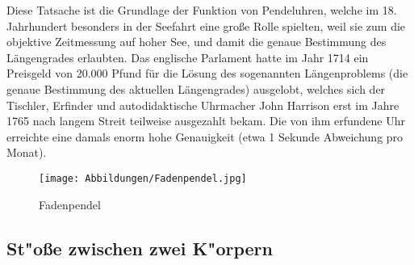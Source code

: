 Diese Tatsache ist die Grundlage der Funktion von Pendeluhren, welche im 18. Jahrhundert besonders in der Seefahrt eine große Rolle spielten, weil sie zum die objektive Zeitmessung auf hoher See, und damit die genaue Bestimmung des Längengrades erlaubten. Das englische Parlament hatte im Jahr 1714 ein Preisgeld von 20.000 Pfund für die Lösung des sogenannten Längenproblems (die genaue Bestimmung des aktuellen Längengrades) ausgelobt, welches sich der Tischler, Erfinder und autodidaktische Uhrmacher John Harrison erst im Jahre 1765 nach langem Streit teilweise ausgezahlt bekam. Die von ihm erfundene Uhr erreichte eine damals enorm hohe Genauigkeit (etwa 1 Sekunde Abweichung pro Monat).
%
\begin{figure}[hb]
	\centering
		\texttt{[image: Abbildungen/Fadenpendel.jpg]}
	\caption{Fadenpendel}
	\label{fig:Fadenpendel}
\end{figure}

\subsection{St"o{\ss}e zwischen zwei K"orpern}

